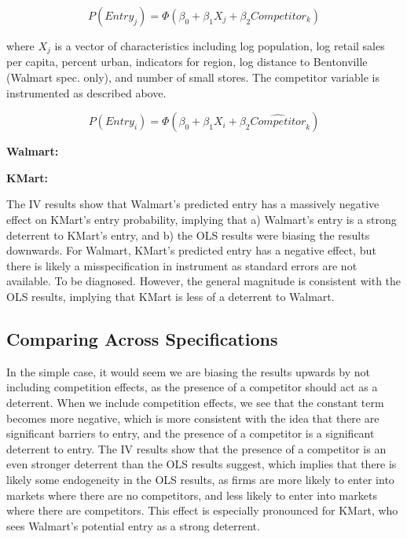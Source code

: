 \documentclass[11pt]{article}
\theoremstyle{definition}
\theoremstyle{remark}
\begin{document}
\begin{equation}
  P(Entry_j) = \Phi(\beta_0 + \beta_1X_j + \beta_2Competitor_k)
\end{equation}

where $X_j$ is a vector of characteristics including log population, log retail sales per capita, percent urban, indicators for region, log distance to Bentonville (Walmart spec. only), and number of small stores. The competitor variable is instrumented as described above.

\begin{equation}
  P(Entry_i) = \Phi(\beta_0 + \beta_1X_i + \beta_2\hat{Competitor}_k)
\end{equation}

\textbf{Walmart:}


\textbf{KMart:}


The IV results show that Walmart's predicted entry has a massively negative effect on KMart's entry probability, implying that a) Walmart's entry is a strong deterrent to KMart's entry, and b) the OLS results were biasing the results downwards. For Walmart, KMart's predicted entry has a negative effect, but there is likely a misspecification in instrument as standard errors are not available. To be diagnosed. However, the general magnitude is consistent with the OLS results, implying that KMart is less of a deterrent to Walmart.

\subsection{Comparing Across Specifications}
In the simple case, it would seem we are biasing the results upwards by not including competition effects, as the presence of a competitor should act as a deterrent. When we include competition effects, we see that the constant term becomes more negative, which is more consistent with the idea that there are significant barriers to entry, and the presence of a competitor is a significant deterrent to entry. The IV results show that the presence of a competitor is an even stronger deterrent than the OLS results suggest, which implies that there is likely some endogeneity in the OLS results, as firms are more likely to enter into markets where there are no competitors, and less likely to enter into markets where there are competitors. This effect is especially pronounced for KMart, who sees Walmart's potential entry as a strong deterrent.
\end{document}
